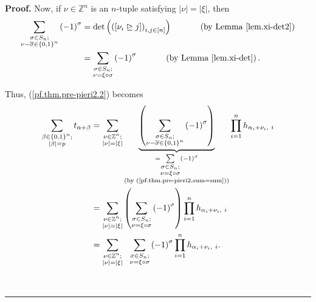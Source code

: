 \documentclass
[numbers=enddot,12pt,final,onecolumn,notitlepage,english]{scrartcl}%
\theoremstyle{definition}
\newenvironment{proof}[1][Proof]{\noindent\textbf{#1.} }{\ \rule{0.5em}{0.5em}}
\let\sumnonlimits\sum
\let\prodnonlimits\prod
\renewcommand{\sum}{\sumnonlimits\limits}
\renewcommand{\prod}{\prodnonlimits\limits}
\newenvironment{verlong}{}{}
\begin{document}
\begin{verlong}
\begin{proof}
Now, if $\nu\in\mathbb{Z}^{n}$ is an $n$-tuple satisfying $\left\vert
\nu\right\vert =\left\vert \xi\right\vert $, then%
\begin{align}
\sum_{\substack{\sigma\in S_{n};\\\nu-\overline{\sigma}\in\left\{
0,1\right\}  ^{n}}}\left(  -1\right)  ^{\sigma}  &  =\det\left(  \left(
\left[  \nu_{i}\trianglerighteq j\right]  \right)  _{i,j\in\left[  n\right]
}\right)  \ \ \ \ \ \ \ \ \ \ \left(  \text{by Lemma \ref{lem.xi-det2}}\right)
\nonumber\\
&  =\sum_{\substack{\sigma\in S_{n};\\\nu=\xi\circ\sigma}}\left(  -1\right)
^{\sigma}\ \ \ \ \ \ \ \ \ \ \left(  \text{by Lemma \ref{lem.xi-det}}\right)
. \label{pf.thm.pre-pieri2.sum=sum}%
\end{align}


Thus, (\ref{pf.thm.pre-pieri2.2}) becomes%
\begin{align}
\sum_{\substack{\beta\in\left\{  0,1\right\}  ^{n};\\\left\vert \beta
\right\vert =p}}t_{\alpha+\beta}  &  =\sum_{\substack{\nu\in\mathbb{Z}%
^{n};\\\left\vert \nu\right\vert =\left\vert \xi\right\vert }%
}\underbrace{\left(  \sum_{\substack{\sigma\in S_{n};\\\nu-\overline{\sigma
}\in\left\{  0,1\right\}  ^{n}}}\left(  -1\right)  ^{\sigma}\right)
}_{\substack{=\sum_{\substack{\sigma\in S_{n};\\\nu=\xi\circ\sigma}}\left(
-1\right)  ^{\sigma}\\\text{(by (\ref{pf.thm.pre-pieri2.sum=sum}))}}%
}\prod_{i=1}^{n}h_{\alpha_{i}+\nu_{i},\ i}\nonumber\\
&  =\sum_{\substack{\nu\in\mathbb{Z}^{n};\\\left\vert \nu\right\vert
=\left\vert \xi\right\vert }}\left(  \sum_{\substack{\sigma\in S_{n};\\\nu
=\xi\circ\sigma}}\left(  -1\right)  ^{\sigma}\right)  \prod_{i=1}^{n}%
h_{\alpha_{i}+\nu_{i},\ i}\nonumber\\
&  =\sum_{\substack{\nu\in\mathbb{Z}^{n};\\\left\vert \nu\right\vert
=\left\vert \xi\right\vert }}\ \ \sum_{\substack{\sigma\in S_{n};\\\nu
=\xi\circ\sigma}}\left(  -1\right)  ^{\sigma}\prod_{i=1}^{n}h_{\alpha_{i}%
+\nu_{i},\ i}. \label{pf.thm.pre-pieri2.2b}%
\end{align}



\end{proof}
\end{verlong}
\end{document}
